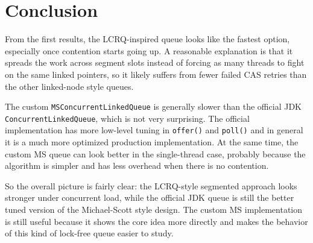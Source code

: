 \section{Conclusion}
From the first results, the LCRQ-inspired queue looks like the fastest option, especially once contention starts going up. A reasonable explanation is that it spreads the work across segment slots instead of forcing as many threads to fight on the same linked pointers, so it likely suffers from fewer failed CAS retries than the other linked-node style queues.

The custom \texttt{MSConcurrentLinkedQueue} is generally slower than the official JDK \texttt{ConcurrentLinkedQueue}, which is not very surprising. The official implementation has more low-level tuning in \texttt{offer()} and \texttt{poll()} and in general it is a much more optimized production implementation. At the same time, the custom MS queue can look better in the single-thread case, probably because the algorithm is simpler and has less overhead when there is no contention.

So the overall picture is fairly clear: the LCRQ-style segmented approach looks stronger under concurrent load, while the official JDK queue is still the better tuned version of the Michael-Scott style design. The custom MS implementation is still useful because it shows the core idea more directly and makes the behavior of this kind of lock-free queue easier to study.
